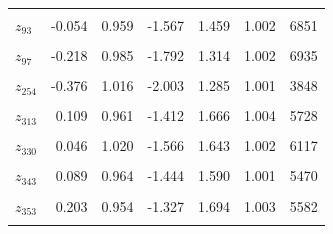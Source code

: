 \begin{longtable}{lrrrrrr}
\cellcolor{gray!10}{$z_{75}$} & \cellcolor{gray!10}{0.012} & \cellcolor{gray!10}{1.025} & \cellcolor{gray!10}{-1.587} & \cellcolor{gray!10}{1.688} & \cellcolor{gray!10}{1.003} & \cellcolor{gray!10}{5609}\\
$z_{93}$ & -0.054 & 0.959 & -1.567 & 1.459 & 1.002 & 6851\\
\cellcolor{gray!10}{$z_{94}$} & \cellcolor{gray!10}{-0.012} & \cellcolor{gray!10}{1.010} & \cellcolor{gray!10}{-1.603} & \cellcolor{gray!10}{1.575} & \cellcolor{gray!10}{1.001} & \cellcolor{gray!10}{5822}\\
$z_{97}$ & -0.218 & 0.985 & -1.792 & 1.314 & 1.002 & 6935\\
\cellcolor{gray!10}{$z_{230}$} & \cellcolor{gray!10}{0.056} & \cellcolor{gray!10}{0.951} & \cellcolor{gray!10}{-1.439} & \cellcolor{gray!10}{1.570} & \cellcolor{gray!10}{1.003} & \cellcolor{gray!10}{6244}\\
$z_{254}$ & -0.376 & 1.016 & -2.003 & 1.285 & 1.001 & 3848\\
\cellcolor{gray!10}{$z_{306}$} & \cellcolor{gray!10}{-0.223} & \cellcolor{gray!10}{0.948} & \cellcolor{gray!10}{-1.743} & \cellcolor{gray!10}{1.342} & \cellcolor{gray!10}{1.000} & \cellcolor{gray!10}{5556}\\
$z_{313}$ & 0.109 & 0.961 & -1.412 & 1.666 & 1.004 & 5728\\
\cellcolor{gray!10}{$z_{329}$} & \cellcolor{gray!10}{0.069} & \cellcolor{gray!10}{0.955} & \cellcolor{gray!10}{-1.437} & \cellcolor{gray!10}{1.610} & \cellcolor{gray!10}{1.002} & \cellcolor{gray!10}{6009}\\
$z_{330}$ & 0.046 & 1.020 & -1.566 & 1.643 & 1.002 & 6117\\
\cellcolor{gray!10}{$z_{334}$} & \cellcolor{gray!10}{-0.132} & \cellcolor{gray!10}{0.961} & \cellcolor{gray!10}{-1.655} & \cellcolor{gray!10}{1.401} & \cellcolor{gray!10}{1.004} & \cellcolor{gray!10}{6104}\\
$z_{343}$ & 0.089 & 0.964 & -1.444 & 1.590 & 1.001 & 5470\\
\cellcolor{gray!10}{$z_{349}$} & \cellcolor{gray!10}{0.099} & \cellcolor{gray!10}{0.982} & \cellcolor{gray!10}{-1.430} & \cellcolor{gray!10}{1.691} & \cellcolor{gray!10}{1.002} & \cellcolor{gray!10}{6137}\\
$z_{353}$ & 0.203 & 0.954 & -1.327 & 1.694 & 1.003 & 5582\\
\cellcolor{gray!10}{$z_{355}$} & \cellcolor{gray!10}{-0.003} & \cellcolor{gray!10}{1.009} & \cellcolor{gray!10}{-1.606} & \cellcolor{gray!10}{1.586} & \cellcolor{gray!10}{1.005} & \cellcolor{gray!10}{6925}\\

\end{longtable}
